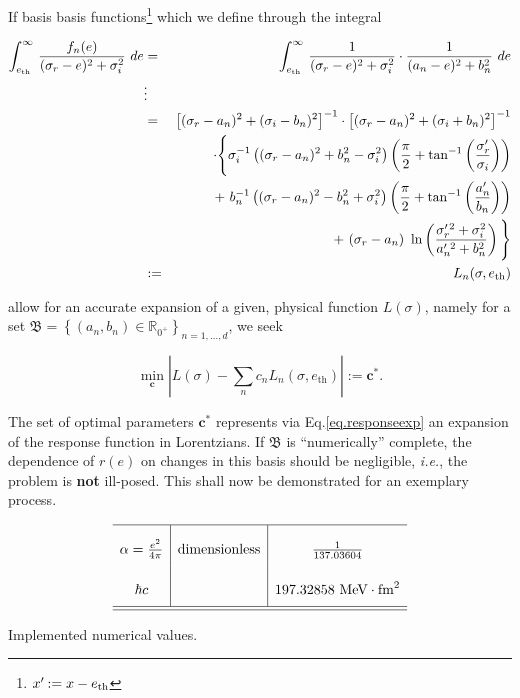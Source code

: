 \documentclass[onecolumn,preprint,superscriptaddress,nofootinbib,notitlepage,10pt,linenumbers]{revtex4-1}
\newcommand*{\mprime}{^{\prime}\mkern-1.2mu}
\newcommand{\ie}{\textit{i.e.}\;}
\newcommand{\be}{\begin{equation}}
\newcommand{\ee}{\end{equation}}
\newcommand{\la}{\label}
\newcommand{\ve}[1]{\ensuremath{\boldsymbol{#1}}}
\begin{document}
If basis basis functions\footnote{$x\mprime:=x-e_\text{th}$} which we define through the integral

\begin{eqnarray*}
\int^\infty_{e_\text{th}}\,\frac{f_n(e)}{(\sigma_r-e)^2+\sigma_i^2}~de
&=&\int_{e_\text{th}}^\infty\,\frac{1}{(\sigma_r-e)^2+\sigma_i^2}\cdot
\frac{1}{(a_n-e)^2+b_n^2}~de\\
&\vdots&\\
&=&\left[(\sigma_r-a_n)^2+(\sigma_i-b_n)^2\right]^{-1}\cdot
\left[(\sigma_r-a_n)^2+(\sigma_i+b_n)^2\right]^{-1}\\
&&\cdot
\Bigg\lbrace
\sigma_i^{-1}\left((\sigma_r-a_n)^2+b_n^2-\sigma_i^2\right)
\left(\frac{\pi}{2}+\tan^{-1}\left(\frac{\sigma_r\mprime}{\sigma_i}\right)\right)\\
&&+~
b_n^{-1}\left((\sigma_r-a_n)^2-b_n^2+\sigma_i^2\right)
\left(\frac{\pi}{2}+\tan^{-1}\left(\frac{a_n\mprime}{b_n}\right)\right)\\&&+~
(\sigma_r-a_n)~\ln\left(\frac{\sigma_r\mprime^2+\sigma_i^2}{a_n\mprime^2+b_n^2}
\right)
\Bigg\rbrace\\
&:=&L_n(\sigma,e_\text{th})
\end{eqnarray*}

allow for an accurate expansion of a given, physical function $L(\sigma)$,
namely for a set $\mathfrak{B}=\left\lbrace (a_n,b_n)\in\mathbb{R}_{0^+}\right\rbrace_{n=1,\ldots,d}$,
we seek

\be
\min_{\ve{c}}\left\vert L(\sigma)-\sum_nc_nL_n(\sigma,e_\text{th})\right\vert:=\ve{c}^*.
\ee

The set of optimal parameters $\ve{c}^*$ represents via Eq.\eqref{eq.responseexp} an expansion
of the response function in Lorentzians.
If $\mathfrak{B}$ is ``numerically'' complete, the dependence of $r(e)$ on changes
in this basis should be negligible, \ie, the problem is {\bf not} ill-posed.
This shall now be demonstrated for an exemplary process.



\begin{table}
\be\la{tab.constants}
\renewcommand{\arraystretch}{2.4}
\setlength{\tabcolsep}{8pt}
\begin{array}{c|c|c}\hline
\alpha=\frac{e^2}{4\pi}&\text{dimensionless}&\frac{1}{137.03604}\\
\hbar c & & 197.32858~\text{MeV}\cdot\text{fm}^2 \\
\hline\hline
\end{array}
\ee
\caption{Implemented numerical values.}
\end{table}
\end{document}
